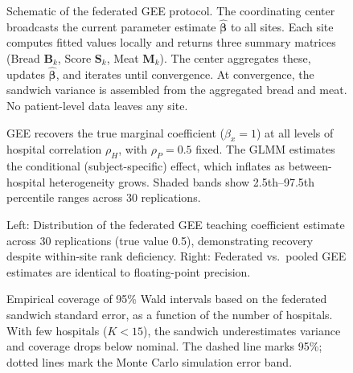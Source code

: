 \documentclass[useAMS,referee]{biom}
\begin{document}

\begin{figure}
\caption{Schematic of the federated GEE protocol. The coordinating center broadcasts the current parameter estimate $\hat{\boldsymbol{\beta}}$ to all sites. Each site computes fitted values locally and returns three summary matrices (Bread $\mathbf{B}_k$, Score $\mathbf{S}_k$, Meat $\mathbf{M}_k$). The center aggregates these, updates $\hat{\boldsymbol{\beta}}$, and iterates until convergence. At convergence, the sandwich variance is assembled from the aggregated bread and meat. No patient-level data leaves any site.}
\label{f:protocol}
\end{figure}

\begin{figure}
\caption{GEE recovers the true marginal coefficient ($\beta_x = 1$) at all levels of hospital correlation $\rho_H$, with $\rho_P = 0.5$ fixed. The GLMM estimates the conditional (subject-specific) effect, which inflates as between-hospital heterogeneity grows. Shaded bands show 2.5th--97.5th percentile ranges across 30 replications.}
\label{f:gee-glmm}
\end{figure}

\begin{figure}
\caption{Left: Distribution of the federated GEE teaching coefficient estimate across 30 replications (true value 0.5), demonstrating recovery despite within-site rank deficiency. Right: Federated vs.\ pooled GEE estimates are identical to floating-point precision.}
\label{f:teaching}
\end{figure}

\begin{figure}
\caption{Empirical coverage of 95\% Wald intervals based on the federated sandwich standard error, as a function of the number of hospitals. With few hospitals ($K < 15$), the sandwich underestimates variance and coverage drops below nominal. The dashed line marks 95\%; dotted lines mark the Monte Carlo simulation error band.}
\label{f:sandwich}
\end{figure}


\label{lastpage}
\end{document}
